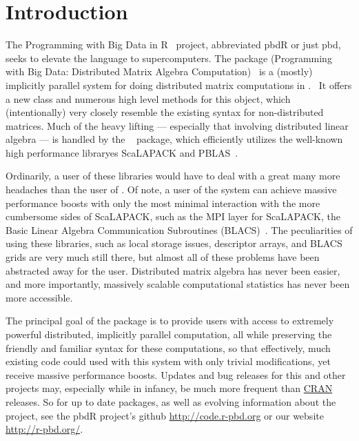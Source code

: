 \section{Introduction}
\label{sec:introduction}

The Programming with Big Data in R~\citep{pbdr2012} project, abbreviated pbdR or just pbd, seeks to elevate the  language to supercomputers.  
The  package (Programming with Big Data: Distributed Matrix Algebra Computation)~\citep{Schmidt2012pbdDMATpackage} is a (mostly) implicitly parallel system for doing distributed matrix computations in .~\citep{Rcore}  It offers a new  class  and numerous high level methods for this object, which (intentionally) very closely resemble the existing  syntax for non-distributed matrices.  Much of the heavy lifting --- especially that involving distributed linear algebra --- is handled by the ~\citep{Schmidt2012pbdBASEpackage} package, which efficiently utilizes the well-known high performance libraryes ScaLAPACK and PBLAS~\citep{slug}.

Ordinarily, a user of these libraries would have to deal with a great many more headaches than the user of .  Of note, a user of the  system can achieve massive performance boosts with only the most minimal interaction with the more cumbersome sides of ScaLAPACK, such as the MPI layer for ScaLAPACK, the Basic Linear Algebra Communication Subroutines (BLACS)~\citep{blug}.  The peculiarities of using these libraries, such as local storage issues, descriptor arrays, and BLACS grids are very much still there, but almost all of these problems have been abstracted away for the user.  Distributed matrix algebra has never been easier, and more importantly, massively scalable computational statistics has never been more accessible.

The principal goal of the  package is to provide  users with access to extremely powerful distributed, implicitly parallel computation, all while preserving the friendly and familiar  syntax for these computations, so that effectively, much existing  code could used with this system with only trivial modifications, yet receive massive performance boosts.  Updates and bug releases for this and other  projects may, especially while in infancy, be much more frequent than \href{http://cran.r-project.org/}{CRAN} releases.  So for up to date packages, as well as evolving information about the  project,  see the pbdR project's github \url{http://code.r-pbd.org} or our website \href{http://r-pbd.org/}{http://r-pbd.org/}.






